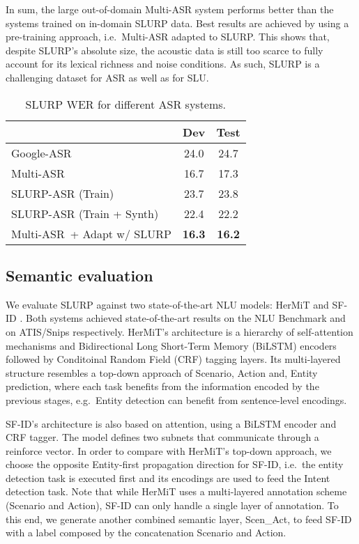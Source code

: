 \documentclass[11pt,a4paper]{article}
\newcommand{\datasetacr}{SLURP}
\newcommand{\slu}{SLU}
\newcommand{\asr}{ASR}
\newcommand{\nlu}{NLU}
\newcommand{\wer}{WER}
\newcommand{\hermit}{HerMiT}
\newcommand{\sfid}{SF-ID}
\newcommand{\gasr}{Google-ASR}
\newcommand{\masr}{Multi-ASR}
\begin{document}
In sum, the large out-of-domain \masr{} system performs better than the systems trained on in-domain \datasetacr{} data. Best results are achieved by using a pre-training approach, i.e.\ \masr{} adapted to \datasetacr. This shows that, despite \datasetacr's absolute size, 
the acoustic data is still too scarce to fully account for its lexical richness and noise conditions. As such, \datasetacr{} is a challenging dataset for \asr{} as well as for \slu.




\begin{table}[t]
	\centering
	\small
	\begin{tabular}{l|c|c}
	\toprule
&  Dev & Test \\ 
	\midrule
    \gasr  & 24.0 & 24.7 \\
    \masr  & 16.7 & 17.3 \\
    \midrule
    \datasetacr{}-ASR (Train) & 23.7  & 23.8 \\
    \datasetacr{}-ASR (Train + Synth) & 22.4 & 22.2 \\ 
    \midrule
    \masr~+ Adapt w/ \datasetacr  &  {\bf 16.3} & {\bf 16.2} \\
    \bottomrule
	\end{tabular}
	\caption{\datasetacr{} \wer{} for different \asr{} systems.}
	\label{tab:wers_generic}
\end{table}

\subsection{Semantic evaluation}


 We evaluate \datasetacr{} against two state-of-the-art \nlu{} models:
\hermit{} \cite{vanzo:2019b} and \sfid{} \cite{e-etal-2019-novel}. Both systems achieved state-of-the-art results on the NLU Benchmark \cite{liu19:benchmarking} and on ATIS/Snips respectively.
\hermit's architecture is a hierarchy of self-attention mechanisms and Bidirectional Long Short-Term Memory (BiLSTM) encoders followed by Conditoinal Random Field (CRF) tagging layers. Its multi-layered structure resembles a  top-down approach of Scenario, Action and, Entity prediction, where each task benefits from the information encoded by the previous stages, e.g.\ Entity detection can benefit from sentence-level encodings. 

\sfid's architecture is also based on attention, using a BiLSTM encoder and CRF tagger. The model defines two subnets that communicate through a reinforce vector. 
In order to compare with \hermit's top-down approach, we choose the opposite Entity-first propagation direction for \sfid, i.e.\ the entity detection task is executed first and its encodings are used to feed the Intent detection task.
Note that while \hermit{} uses a multi-layered annotation scheme (Scenario and Action), \sfid{} can only handle a single layer of annotation. To this end, we generate another combined semantic layer, Scen\_Act, to feed \sfid{} with a label composed by the concatenation Scenario and Action.
\end{document}
